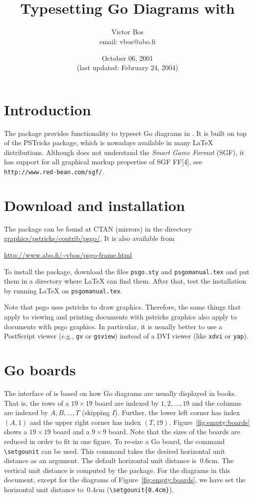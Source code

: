 \documentclass[a4paper]{article}
\title{\psgo\\{\normalfont\normalsize Typesetting Go Diagrams with \pstricks}}
\author{Victor Bos\\email: vbos@abo.fi}
\date{October 06, 2001\\(last updated: February 24, 2004)}
\newcommand{\pstricks}{\textsf{PSTricks}}
\begin{document}
\maketitle


\section{Introduction}

The \psgo{} package provides functionality to typeset Go diagrams in
\LaTeXe. It is built on top of the \pstricks{} package, which is
nowadays available in many \LaTeX{} distributions. Although \psgo{}
does not understand the \emph{Smart Game Format} (SGF), it has support
for all graphical markup properties of SGF FF[4], see
\verb|http://www.red-bean.com/sgf/|.

\section{Download and installation}

The \psgo{} package can be found at CTAN (mirrors) in the directory
\url{graphics/pstricks/contrib/psgo/}. It is also available from

\medskip
\url{http://www.abo.fi/~vbos/psgo-frame.html}

\medskip\noindent To install the package, download the files
\texttt{psgo.sty} and \texttt{psgomanual.tex} and put them in a
directory where \LaTeX{} can find them. After that, test the
installation by running \LaTeX{} on \texttt{psgomanual.tex}. 

Note that \textsf{psgo} uses \textsf{pstricks} to draw
graphics. Therefore, the same things that apply to viewing and
printing documents with \textsf{pstricks} graphics also apply to
documents with \textsf{psgo} graphics. In particular, it is usually
better to use a PostScript viewer (e.g., \texttt{gv} or
\texttt{gsview}) instead of a DVI viewer (like \texttt{xdvi} or
\texttt{yap}).
 
\section{Go boards}

The interface of \psgo{} is based on how Go diagrams are usually
displayed in books. That is, the rows of a $19\times19$ board are
indexed by $1,2,\ldots,19$ and the columns are indexed by $A, B,
\ldots, T$ (skipping $I$). Further, the lower left corner has index
$(A, 1)$ and the upper right corner has index
$(T,19)$. Figure~\ref{fig:empty:boards} shows a $19\times 19$ board
and a $9\times9$ board. Note that the sizes of the boards are reduced
in order to fit in one figure. To re-size a Go board, the command
\verb|\setgounit| can be used. This command takes the desired
horizontal unit distance as an argument. The default horizontal unit
distance is~$0.6$cm. The vertical unit distance is computed by the
\psgo{} package. For the diagrams in this document, except for the
diagrams of Figure~\ref{fig:empty:boards}, we have set the horizontal
unit distance to~$0.4$cm (\verb|\setgounit{0.4cm}|).
\end{document}
